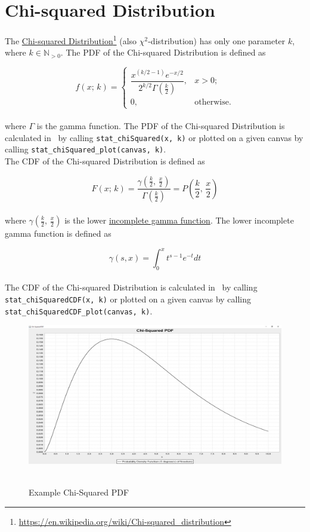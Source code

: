 	\section{Chi-squared Distribution}

		The \href{https://en.wikipedia.org/wiki/Chi-squared_distribution}{Chi-squared Distribution}\footnote{\url{https://en.wikipedia.org/wiki/Chi-squared_distribution}} (also $\chi^2$-distribution) has only one parameter $k$, where $k \in \mathbb{N}_{>0}$. The \ac{PDF} of the Chi-squared Distribution is defined as

		$$f(x;\,k) =
		\begin{cases}
			\dfrac{x^{(k/2-1)} e^{-x/2}}{2^{k/2} \Gamma\left(\frac k 2 \right)},  & x > 0; \\ 0, & \text{otherwise}.
		\end{cases}$$
		\\[0.3cm]
		where $\Gamma$ is the gamma function. The \ac{PDF} of the Chi-squared Distribution is calculated in \setlx\ by calling \lstinline{stat_chiSquared(x, k)} or plotted on a given canvas by calling \lstinline{stat_chiSquared_plot(canvas, k)}.
		\\[0.3cm]
		The \ac{CDF} of the Chi-squared Distribution is defined as

		$$F(x;\,k) = \frac{\gamma(\frac{k}{2},\,\frac{x}{2})}{\Gamma(\frac{k}{2})} = P\left(\frac{k}{2},\,\frac{x}{2}\right)$$
		\\[0.3cm]
		where $\gamma(\frac{k}{2},\,\frac{x}{2})$ is the lower \href{https://en.wikipedia.org/wiki/Incomplete_gamma_function}{incomplete gamma function}. The lower incomplete gamma function is defined as 

		$$\gamma(s, x) = \int_{0}^{x}{t^{s-1}e^{-t} dt}$$
		\\[0.3cm]
		The \ac{CDF} of the Chi-squared Distribution is calculated in \setlx\ by calling \lstinline{stat_chiSquaredCDF(x, k)} or plotted on a given canvas by calling \lstinline{stat_chiSquaredCDF_plot(canvas, k)}.

		\begin{figure}[H]
			\centering
			\includegraphics[width=1\textwidth]{Figures/implemented_functions/chi_squared_pdf}~\\
			\caption{Example Chi-Squared PDF}
			\label{fig:chi_squared_pdf}
		\end{figure}


